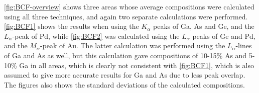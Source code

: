 

\cref{fig:BCF-overview} shows three areas whose average compositions were calculated using all three techniques, and again two separate calculations were performed. \cref{fig:BCF1} shows the results when using the $K_\alpha$ peaks of Ga, As and Ge, and the $L_\alpha$-peak of Pd, while \cref{fig:BCF2} was calculated using the $L_\alpha$ peaks of Ge and Pd, and the $M_\alpha$-peak of Au. The latter calculation was performed using the $L_\alpha$-lines of Ga and As as well, but this calculation gave compositions of 10-15\% As and 5-10\% Ga in all areas, which is clearly not consistent with \cref{fig:BCF1}, which is also assumed to give more accurate results for Ga and As due to less peak overlap. The figures also shows the standard deviations of the calculated compositions.

